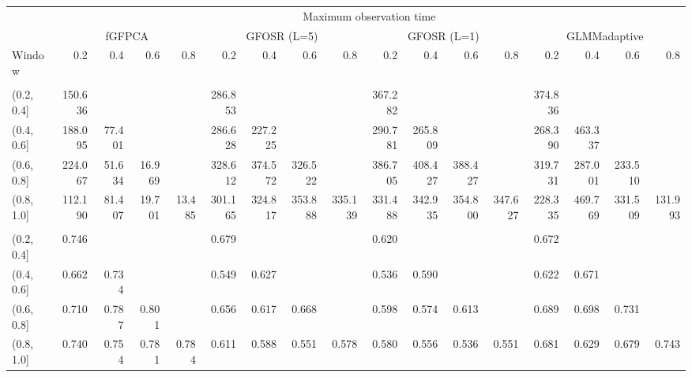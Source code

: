 \documentclass[
]{article}
\begin{document}
\begin{landscape}
\begin{longtable}[t]{lrrrrrrrrrrrrrrrr}
\toprule
\multicolumn{1}{c}{ } & \multicolumn{16}{c}{Maximum observation time} \\
\cmidrule(l{3pt}r{3pt}){2-17}
\multicolumn{1}{c}{ } & \multicolumn{4}{c}{fGFPCA} & \multicolumn{4}{c}{GFOSR (L=5)} & \multicolumn{4}{c}{GFOSR (L=1)} & \multicolumn{4}{c}{GLMMadaptive} \\
\cmidrule(l{3pt}r{3pt}){2-5} \cmidrule(l{3pt}r{3pt}){6-9} \cmidrule(l{3pt}r{3pt}){10-13} \cmidrule(l{3pt}r{3pt}){14-17}
Window & 0.2 & 0.4 & 0.6 & 0.8 & 0.2 & 0.4 & 0.6 & 0.8 & 0.2 & 0.4 & 0.6 & 0.8 & 0.2 & 0.4 & 0.6 & 0.8\\
\midrule
\addlinespace[0.3em]
\multicolumn{17}{l}{\textbf{ISE}}\\
\hspace{1em}(0.2, 0.4] & 150.636 &  &  &  & 286.853 &  &  &  & 367.282 &  &  &  & 374.836 &  &  & \\
\hspace{1em}(0.4, 0.6] & 188.095 & 77.401 &  &  & 286.628 & 227.225 &  &  & 290.781 & 265.809 &  &  & 268.390 & 463.337 &  & \\
\hspace{1em}(0.6, 0.8] & 224.067 & 51.634 & 16.969 &  & 328.612 & 374.572 & 326.522 &  & 386.705 & 408.427 & 388.427 &  & 319.731 & 287.001 & 233.510 & \\
\hspace{1em}(0.8, 1.0] & 112.190 & 81.407 & 19.701 & 13.485 & 301.165 & 324.817 & 353.888 & 335.139 & 331.488 & 342.935 & 354.800 & 347.627 & 228.335 & 469.769 & 331.509 & 131.993\\
\addlinespace[0.3em]
\multicolumn{17}{l}{\textbf{AUC}}\\
\hspace{1em}(0.2, 0.4] & 0.746 &  &  &  & 0.679 &  &  &  & 0.620 &  &  &  & 0.672 &  &  & \\
\hspace{1em}(0.4, 0.6] & 0.662 & 0.734 &  &  & 0.549 & 0.627 &  &  & 0.536 & 0.590 &  &  & 0.622 & 0.671 &  & \\
\hspace{1em}(0.6, 0.8] & 0.710 & 0.787 & 0.801 &  & 0.656 & 0.617 & 0.668 &  & 0.598 & 0.574 & 0.613 &  & 0.689 & 0.698 & 0.731 & \\
\hspace{1em}(0.8, 1.0] & 0.740 & 0.754 & 0.781 & 0.784 & 0.611 & 0.588 & 0.551 & 0.578 & 0.580 & 0.556 & 0.536 & 0.551 & 0.681 & 0.629 & 0.679 & 0.743\\
\bottomrule
\end{longtable}
\end{landscape}
\end{document}
